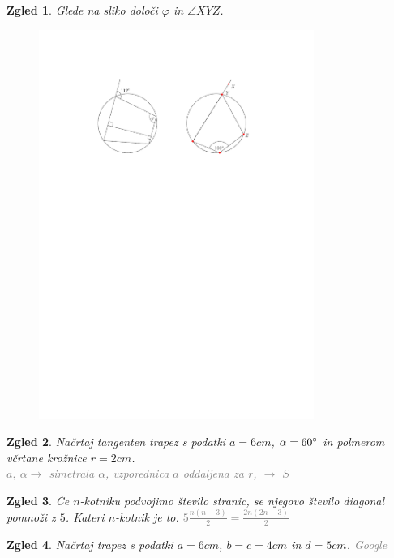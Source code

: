 \documentclass{article}
\newtheorem*{zgled}{Zgled}
\begin{document}
\begin{zgled}
    Glede na sliko določi $\varphi$ in $\angle XYZ$.
    \begin{figure}[H]
    \includegraphics[width=0.8\textwidth]{naloga.pdf}
    \centering
    \end{figure}
\end{zgled}

\begin{zgled}
    Načrtaj tangenten trapez s podatki $a=6cm$, $\alpha =60\degree$ in polmerom včrtane krožnice $r=2cm$.\\
    \textcolor{gray}{$a, \ \alpha \rightarrow$ simetrala $\alpha$, vzporednica $a$ oddaljena za $r$, $\rightarrow$ $S$}
\end{zgled}

\begin{zgled}
    Če $n$-kotniku podvojimo število stranic, se njegovo število diagonal pomnoži z $5$. Kateri $n$-kotnik je to. \textcolor{gray}{$5\frac{n(n-3)}{2}=\frac{2n(2n-3)}{2}$}
\end{zgled}

\begin{zgled}
    Načrtaj trapez s podatki $a=6cm$, $b=c=4cm$ in $d=5cm$. \textcolor{gray}{Google}
\end{zgled}
\end{document}
